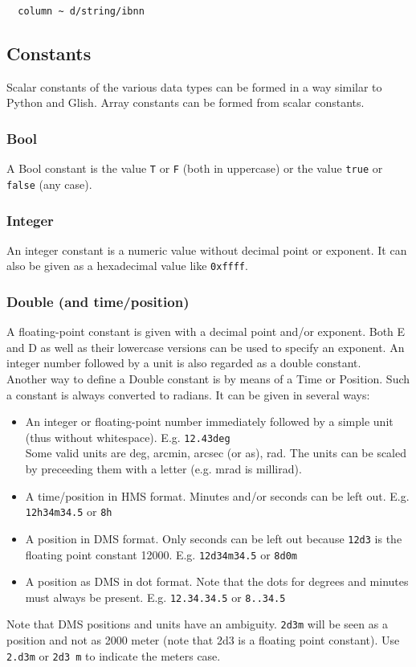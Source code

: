 \begin{verbatim}
  column ~ d/string/ibnn
\end{verbatim}

\subsection{\label{TAQL:CONSTANTS}Constants}
Scalar constants of the various data types can be formed in a way similar
to Python and Glish. Array constants can be formed from scalar
constants.
\subsubsection{Bool}
  A Bool constant is the value \texttt{T} or \texttt{F} (both in
  uppercase) or the value \texttt{true} or \texttt{false} (any case).
\subsubsection{Integer}
  An integer constant is a numeric value without decimal point or exponent.
  It can also be given as a hexadecimal value like \texttt{0xffff}.
\subsubsection{Double (and time/position)}
  A floating-point constant is given with a decimal point and/or
  exponent. Both E and D as well as their lowercase versions can be
  used to specify an exponent. An integer
  number followed by a unit is also regarded as a double constant.
  \\Another way to define a Double constant is by means of
  a Time or Position. Such a constant is always converted to radians.
  It can be given in several ways:
  \begin{itemize}
  \item An integer or floating-point number immediately
    followed by a simple unit
    (thus without whitespace). E.g. \texttt{12.43deg}
    \\Some valid units are deg, arcmin, arcsec (or as), rad.
    The units can be scaled by preceeding them with a letter
    (e.g. mrad is millirad).
  \item A time/position in HMS format. Minutes and/or
    seconds can be left out.
    E.g. \texttt{12h34m34.5} or \texttt{8h}
  \item A position in DMS format. Only seconds can be
    left out because \texttt{12d3} is the floating point constant 12000.
    E.g. \texttt{12d34m34.5} or \texttt{8d0m}
  \item A position as DMS in dot format. Note that the dots
    for degrees and minutes must always be present.
    E.g. \texttt{12.34.34.5} or \texttt{8..34.5}
  \end{itemize}
  Note that DMS positions and units have an ambiguity.
  \texttt{2d3m} will be seen as a position and not
  as 2000 meter (note that 2d3 is a floating point constant).
  Use \texttt{2.d3m} or \texttt{2d3 m} to indicate the meters case.

